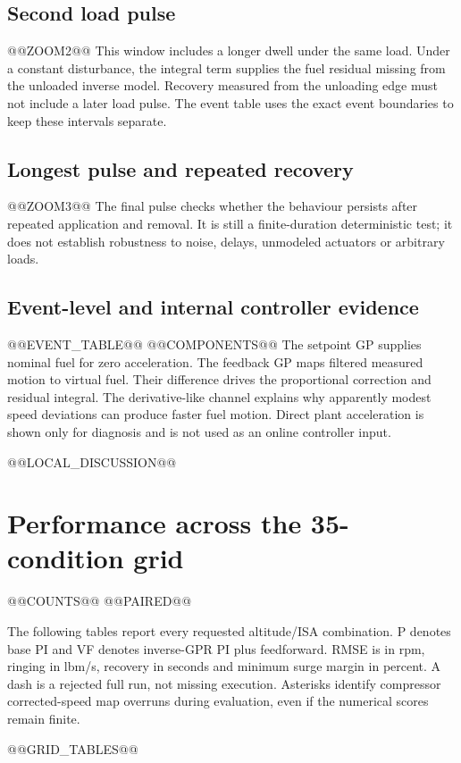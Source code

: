 \clearpage
\subsection{Second load pulse}
@@ZOOM2@@
This window includes a longer dwell under the same load. Under a constant disturbance, the integral term supplies the fuel residual missing from the unloaded inverse model. Recovery measured from the unloading edge must not include a later load pulse. The event table uses the exact event boundaries to keep these intervals separate.

\clearpage
\subsection{Longest pulse and repeated recovery}
@@ZOOM3@@
The final pulse checks whether the behaviour persists after repeated application and removal. It is still a finite-duration deterministic test; it does not establish robustness to noise, delays, unmodeled actuators or arbitrary loads.

\clearpage
\subsection{Event-level and internal controller evidence}
@@EVENT_TABLE@@
@@COMPONENTS@@
The setpoint GP supplies nominal fuel for zero acceleration. The feedback GP maps filtered measured motion to virtual fuel. Their difference drives the proportional correction and residual integral. The derivative-like channel explains why apparently modest speed deviations can produce faster fuel motion. Direct plant acceleration is shown only for diagnosis and is not used as an online controller input.

@@LOCAL_DISCUSSION@@

\clearpage
\section{Performance across the 35-condition grid}
@@COUNTS@@
@@PAIRED@@

The following tables report every requested altitude/ISA combination. P denotes base PI and VF denotes inverse-GPR PI plus feedforward. RMSE is in rpm, ringing in lbm/s, recovery in seconds and minimum surge margin in percent. A dash is a rejected full run, not missing execution. Asterisks identify compressor corrected-speed map overruns during evaluation, even if the numerical scores remain finite.

@@GRID_TABLES@@

